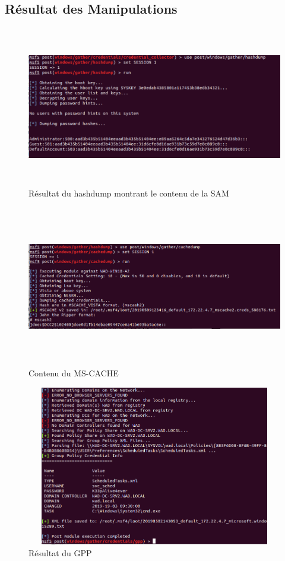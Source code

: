 \documentclass[12pt]{report} %
\begin{document}
\newpage
\subsection*{Résultat des Manipulations}

\begin{figure}[!h]
	\includegraphics[width=17cm, height=7cm]{hashdump_SAM_3_3.PNG}
	\caption*{Résultat du hashdump montrant le contenu de la SAM}
\end{figure}

\begin{figure}[!h]
	\includegraphics[width=17cm, height=7cm]{mscash_3_3.PNG}
	\caption*{Contenu du MS-CACHE}
\end{figure}

\begin{figure}[!h]
	\includegraphics[width=17cm, height=7cm]{3_3_first_gather_gpp.PNG}
	\caption*{Résultat du GPP}
\end{figure}
\end{document}
